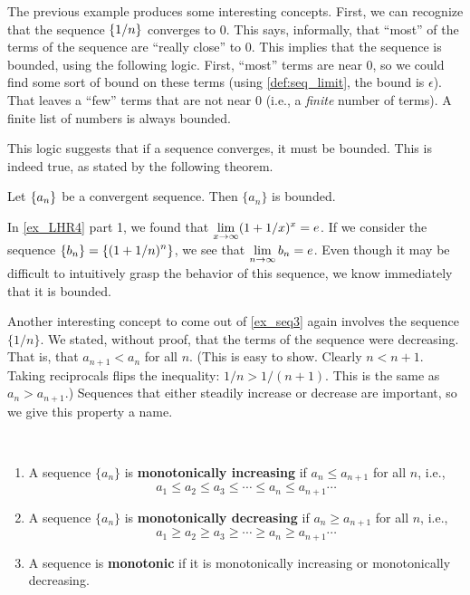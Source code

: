 The previous example produces some interesting concepts. First, we can recognize that the sequence $\displaystyle\left\{1/n\right\}$ converges to 0. This says, informally, that ``most'' of the terms of the sequence are ``really close'' to 0. This implies that the sequence is bounded, using the following logic. First, ``most'' terms are near 0, so we could find some sort of bound on these terms (using \autoref{def:seq_limit}, the bound is $\epsilon$). That leaves a ``few'' terms that are not near 0 (i.e., a \emph{finite} number of terms). A finite list of numbers is always bounded. 

This logic suggests that if a sequence converges, it must be bounded. This is indeed true, as stated by the following theorem.

\begin{theorem}\label{thm:converge_bounded}%
Let $\displaystyle \left\{a_n\right\}$ be a convergent sequence. Then $\{a_n\}$ is bounded.
\end{theorem}


In \autoref{ex_LHR4} part 1, we found that $\displaystyle \lim_{x\to \infty} (1+1/x)^x=e$. If we consider the sequence $\displaystyle \{b_n\}=\{(1+1/n)^n\}$, we see that $\displaystyle \lim_{n\to \infty}b_n=e$. Even though it may be difficult to intuitively grasp the behavior of this sequence, we know immediately that it is bounded.

Another interesting concept to come out of \autoref{ex_seq3} again involves the sequence $\{1/n\}$. We stated, without proof, that the terms of the sequence were decreasing. That is, that $a_{n+1} < a_n$ for all $n$. (This is easy to show. Clearly $n < n+1$. Taking reciprocals flips the inequality: $1/n > 1/(n+1)$. This is the same as $a_n > a_{n+1}$.) Sequences that either steadily increase or decrease are important, so we give this property a name.

\begin{definition}\label{def:monotonic}%
\mbox{}\\[-2\baselineskip]\begin{enumerate}
\item		A sequence $\{a_n\}$ is \textbf{monotonically increasing} if $a_n \leq a_{n+1}$ for all $n$, i.e.,
\[a_1 \leq a_2 \leq a_3 \leq \dotsb \leq a_n \leq a_{n+1} \dotsb\]
 \item	A sequence $\{a_n\}$ is \textbf{monotonically decreasing} if $a_n \geq a_{n+1}$ for all $n$, i.e.,
\[a_1 \geq a_2 \geq a_3 \geq \dotsb\geq a_n \geq a_{n+1} \dotsb\]
 \item	A sequence is \textbf{monotonic} if it is monotonically increasing or monotonically decreasing.
 \end{enumerate}
\end{definition}

